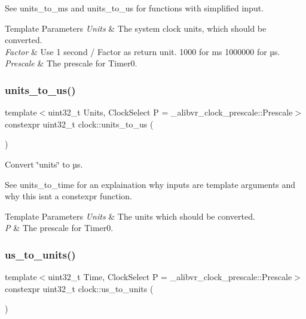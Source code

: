 See units\+\_\+to\+\_\+ms and units\+\_\+to\+\_\+us for functions with simplified input.


\begin{DoxyTemplParams}{Template Parameters}
{\em Units} & The system clock units, which should be converted. \\
\hline
{\em Factor} & Use 1 second / Factor as return unit. 1\textquotesingle{}000 for ms 1\textquotesingle{}000\textquotesingle{}000 for µs. \\
\hline
{\em Prescale} & The prescale for {\ttfamily Timer0}. \\
\hline
\end{DoxyTemplParams}
\hypertarget{namespaceclock_a320b3614df868e901b2f022f70a3d8ae}{}\label{namespaceclock_a320b3614df868e901b2f022f70a3d8ae} 
\subsubsection{\texorpdfstring{units\+\_\+to\+\_\+us()}{units\_to\_us()}}
{\footnotesize\ttfamily template$<$uint32\+\_\+t Units, Clock\+Select P = \+\_\+alibvr\+\_\+clock\+\_\+prescale\+::\+Prescale$>$ \\
constexpr uint32\+\_\+t clock\+::units\+\_\+to\+\_\+us (\begin{DoxyParamCaption}{ }\end{DoxyParamCaption})\hspace{0.3cm}{\ttfamily [inline]}}



Convert \char`\"{}units\char`\"{} to µs. 

See units\+\_\+to\+\_\+time for an explaination why inputs are template arguments and why this isn\textquotesingle{}t a constexpr function.


\begin{DoxyTemplParams}{Template Parameters}
{\em Units} & The units which should be converted. \\
\hline
{\em P} & The prescale for {\ttfamily Timer0}. \\
\hline
\end{DoxyTemplParams}
\hypertarget{namespaceclock_a058555acfdfbc406daf1cb9331b0bc6f}{}\label{namespaceclock_a058555acfdfbc406daf1cb9331b0bc6f} 
\subsubsection{\texorpdfstring{us\+\_\+to\+\_\+units()}{us\_to\_units()}}
{\footnotesize\ttfamily template$<$uint32\+\_\+t Time, Clock\+Select P = \+\_\+alibvr\+\_\+clock\+\_\+prescale\+::\+Prescale$>$ \\
constexpr uint32\+\_\+t clock\+::us\+\_\+to\+\_\+units (\begin{DoxyParamCaption}{ }\end{DoxyParamCaption})\hspace{0.3cm}{\ttfamily [inline]}}



